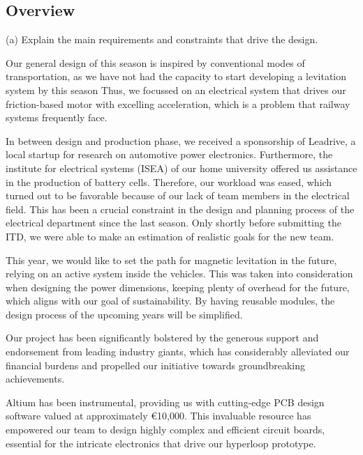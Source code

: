 \subsection{Overview}
(a) Explain the main requirements and constraints that drive the design. \\
\par Our general design of this season is inspired by conventional modes of transportation,
as we have not had the capacity to start developing a levitation system by this season
Thus, we focussed on an electrical system that drives our friction-based motor with
excelling acceleration, which is a problem that railway systems frequently face.

\par In between design and production phase, we received a sponsorship of Leadrive,
a local startup for research on automotive power electronics.
Furthermore, the institute for electrical systems (ISEA) of our home university offered us assistance in the production of battery cells.
Therefore, our workload was eased, which turned out to be favorable
because of our lack of team members in the electrical field. This has been a crucial
constraint in the design and planning process of the electrical department
since the last season. Only shortly before submitting the ITD, we were able to make an estimation of
realistic goals for the new team.

\par This year, we would like to set the path for magnetic levitation in the future, relying on an active system
inside the vehicles. This was taken into consideration when designing the power dimensions,
keeping plenty of overhead for the future, which aligns with our goal of sustainability.
By having reusable modules, the design process of the upcoming years will be simplified.

\par Our project has been significantly bolstered by the generous support and endorsement from leading industry giants, which has considerably alleviated our financial burdens and propelled our initiative towards groundbreaking achievements.

Altium has been instrumental, providing us with cutting-edge PCB design software valued at approximately \euro 10,000. This invaluable resource has empowered our team to design highly complex and efficient circuit boards, essential for the intricate electronics that drive our hyperloop prototype.

